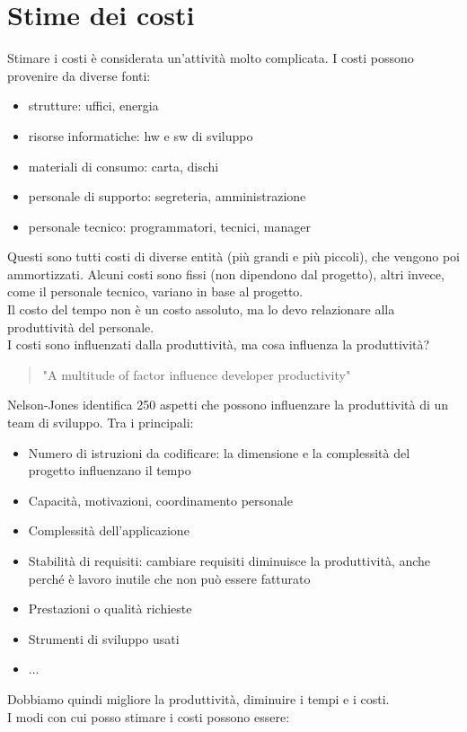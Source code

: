 \section{Stime dei costi}
Stimare i costi è considerata un'attività molto complicata.
I costi possono provenire da diverse fonti:
\begin{itemize}
    \item strutture: uffici, energia
    \item risorse informatiche: hw e sw di sviluppo
    \item materiali di consumo: carta, dischi
    \item personale di supporto: segreteria, amministrazione
    \item personale tecnico: programmatori, tecnici, manager
\end{itemize}
Questi sono tutti costi di diverse entità (più grandi e più piccoli), che vengono poi ammortizzati. Alcuni costi sono fissi (non dipendono dal progetto), altri invece, come il personale tecnico, variano in base al progetto.\\
Il costo del tempo non è un costo assoluto, ma lo devo relazionare alla produttività del personale.\\
I costi sono influenzati dalla produttività, ma cosa influenza la produttività?
\begin{quote}
    "A multitude of factor influence developer productivity"
\end{quote}
Nelson-Jones identifica 250 aspetti che possono influenzare la produttività di un team di sviluppo. Tra i principali:
\begin{itemize}
    \item Numero di istruzioni da codificare: la dimensione e la complessità del progetto influenzano il tempo
    \item Capacità, motivazioni, coordinamento personale 
    \item Complessità dell'applicazione
    \item Stabilità di requisiti: cambiare requisiti diminuisce la produttività, anche perché è lavoro inutile che non può essere fatturato
    \item Prestazioni o qualità richieste
    \item Strumenti di sviluppo usati
    \item ...
\end{itemize}
Dobbiamo quindi migliore la produttività, diminuire i tempi e i costi.\\ I modi con cui posso stimare i costi possono essere:
